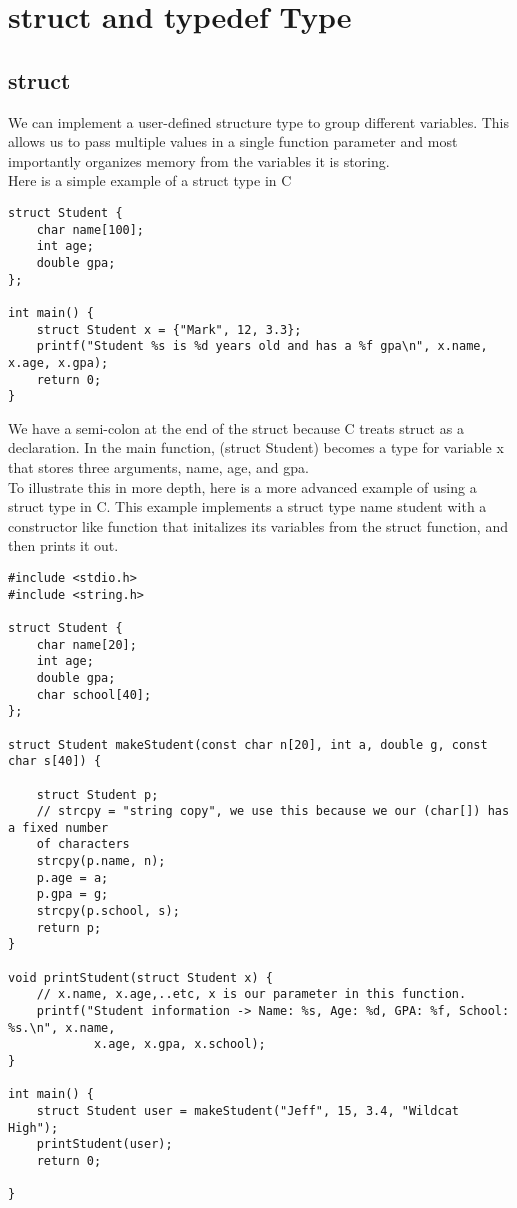 \documentclass{article}
\begin{document}
\section{struct and typedef Type}
\subsection*{struct}
We can implement a user-defined structure type to group different variables. This allows us to pass multiple values in a single function parameter and 
most importantly organizes memory from the variables it is storing. \\

Here is a simple example of a struct type in C

\begin{verbatim}
struct Student {
	char name[100];
	int age;
	double gpa;
};

int main() {
	struct Student x = {"Mark", 12, 3.3};
	printf("Student %s is %d years old and has a %f gpa\n", x.name, x.age, x.gpa);
	return 0;
}
\end{verbatim}

We have a semi-colon at the end of the struct because C treats struct as a declaration. In the main function, (struct Student) becomes a type for
variable x that stores three arguments, name, age, and gpa.\\

\noindent To illustrate this in more depth, here is a more advanced example of using a struct type in C. This example implements a struct type name student
with a constructor like function that initalizes its variables from the struct function, and then prints it out.

\begin{verbatim}
#include <stdio.h>
#include <string.h>

struct Student {
	char name[20];
	int age;
	double gpa;
	char school[40];
};

struct Student makeStudent(const char n[20], int a, double g, const char s[40]) {

	struct Student p;
	// strcpy = "string copy", we use this because we our (char[]) has a fixed number 
	of characters
	strcpy(p.name, n);
	p.age = a;
	p.gpa = g;
	strcpy(p.school, s);
	return p;
}

void printStudent(struct Student x) {
	// x.name, x.age,..etc, x is our parameter in this function.
	printf("Student information -> Name: %s, Age: %d, GPA: %f, School: %s.\n", x.name, 
			x.age, x.gpa, x.school);
}

int main() {
	struct Student user = makeStudent("Jeff", 15, 3.4, "Wildcat High");
	printStudent(user);
	return 0;

}
\end{verbatim}
\end{document}
